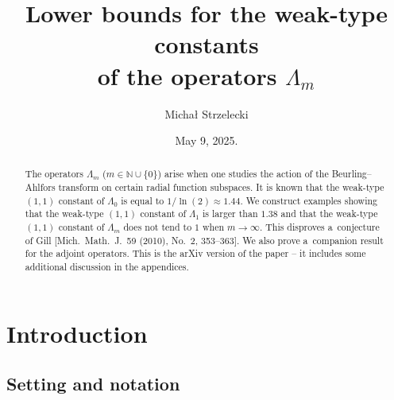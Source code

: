 \documentclass[a4paper]{amsart} %
\theoremstyle{definition}
\theoremstyle{remark}
\numberwithin{equation}{section}
\begin{document}
\title[]{Lower bounds for the weak-type constants\\
of the operators $\Lambda_m$}

\author[M. Strzelecki]{Micha\l{} Strzelecki}
\address{University of Warsaw, Institute of Mathematics, Banacha 2, 02--097 Warsaw, Poland.}



\date{May 9, 2025.}


\begin{abstract}	
The operators $\Lambda_m$ ($m\in\mathbb{N}\cup \{0\}$)
arise when one studies
the  action of the Beurling--Ahlfors transform
on certain radial function subspaces.
It is known that the weak-type $(1,1)$
constant of $\Lambda_0$ is equal to $1/\ln(2)\approx 1.44$.
We construct examples showing that
the weak-type $(1,1)$ constant of $\Lambda_1$ is larger than $1.38$ 
and that 
the weak-type $(1,1)$ constant of $\Lambda_m$ does not tend to $1$ when $m\to\infty$. 
This disproves a~conjecture of Gill [Mich.\ Math.\ J.\ 59 (2010), No.\ 2, 353--363].
We also prove a~companion result for the adjoint operators.
This is the arXiv version of the paper -- it includes some additional discussion in the appendices.
\end{abstract}



\maketitle

\tableofcontents





\section{Introduction}



\subsection{Setting and notation}
\end{document}
